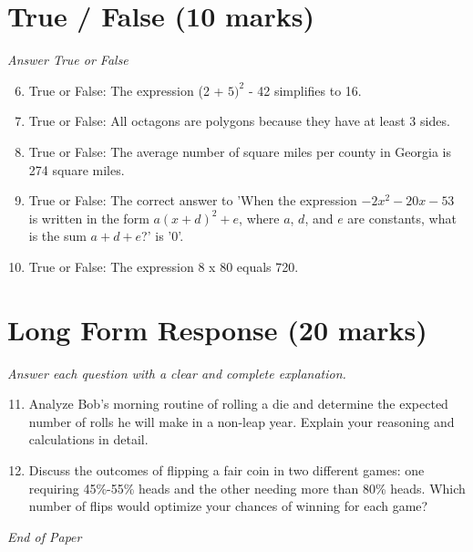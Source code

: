 \documentclass[12pt]{article}
\begin{document}
\section*{True / False (10 marks)}
\textit{Answer True or False}
\begin{enumerate}[label=\arabic*.]
\setcounter{enumi}{5}
\item True or False: The expression (2 + $5)^2$ - 42 simplifies to 16.
\item True or False: All octagons are polygons because they have at least 3 sides.
\item True or False: The average number of square miles per county in Georgia is 274 square miles.
\item True or False: The correct answer to 'When the expression $-2 x^2-20 x-53$ is written in the form $a(x+d)^2+e$, where $a$, $d$, and $e$ are constants, what is the sum $a+d+e$?' is '0'.
\item True or False: The expression 8 x 80 equals 720.
\end{enumerate}

\section*{Long Form Response (20 marks)}
\textit{Answer each question with a clear and complete explanation.}
\begin{enumerate}[label=\arabic*.]
\setcounter{enumi}{10}
\item Analyze Bob's morning routine of rolling a die and determine the expected number of rolls he will make in a non-leap year. Explain your reasoning and calculations in detail.
\item Discuss the outcomes of flipping a fair coin in two different games: one requiring 45\%-55\% heads and the other needing more than 80\% heads. Which number of flips would optimize your chances of winning for each game?
\end{enumerate}

\vfill
\noindent\textit{End of Paper}
\end{document}
